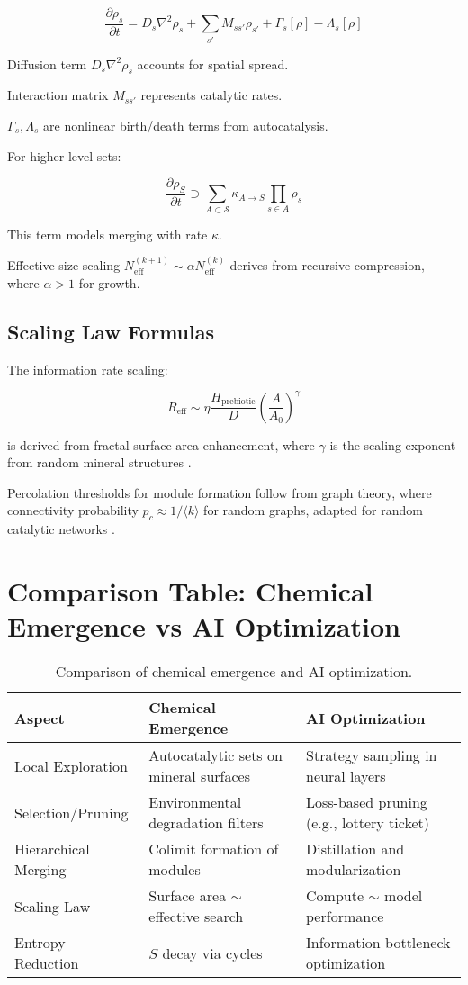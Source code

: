 \documentclass{book}
\begin{document}
\[\frac{\partial \rho_s}{\partial t} = D_s \nabla^2 \rho_s + \sum_{s'} M_{ss'} \rho_{s'} + \Gamma_s[\rho] - \Lambda_s[\rho]\]

Diffusion term $D_s \nabla^2 \rho_s$ accounts for spatial spread.

Interaction matrix $M_{ss'}$ represents catalytic rates.

$\Gamma_s, \Lambda_s$ are nonlinear birth/death terms from autocatalysis.

For higher-level sets:

\[\frac{\partial \rho_S}{\partial t} \supset \sum_{A \subset \mathcal{S}} \kappa_{A \to S} \prod_{s \in A} \rho_s\]

This term models merging with rate $\kappa$.

Effective size scaling $N_{\mathrm{eff}}^{(k+1)} \sim \alpha N_{\mathrm{eff}}^{(k)}$ derives from recursive compression, where $\alpha > 1$ for growth.

\section{Scaling Law Formulas}
The information rate scaling:

\[R_{\mathrm{eff}} \sim \eta \frac{H_{\mathrm{prebiotic}}}{D} \left( \frac{A}{A_0} \right)^\gamma\]

is derived from fractal surface area enhancement, where $\gamma$ is the scaling exponent from random mineral structures \citep{peng2022}.

Percolation thresholds for module formation follow from graph theory, where connectivity probability $p_c \approx 1 / \langle k \rangle$ for random graphs, adapted for random catalytic networks \citep{hordijk2010}.

\chapter{Comparison Table: Chemical Emergence vs AI Optimization}
\begin{table}[h]
\centering
\begin{tabular}{lll}
\toprule
Aspect & Chemical Emergence & AI Optimization \\
\midrule
Local Exploration & Autocatalytic sets on mineral surfaces & Strategy sampling in neural layers \\
Selection/Pruning & Environmental degradation filters & Loss-based pruning (e.g., lottery ticket) \\
Hierarchical Merging & Colimit formation of modules & Distillation and modularization \\
Scaling Law & Surface area $\sim$ effective search & Compute $\sim$ model performance \\
Entropy Reduction & $S$ decay via cycles & Information bottleneck optimization \\
\bottomrule
\end{tabular}
\caption{Comparison of chemical emergence and AI optimization.}
\end{table}



\end{document}
